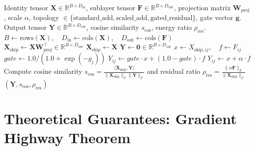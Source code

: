 \documentclass[11pt]{article}
\begin{document}
\begin{algorithm}[H]
\caption{Deterministic Residual Combination and Projection Execution}
\label{alg:residual}
\begin{algorithmic}[1]
\Require Identity tensor $\mathbf{X} \in \mathbb{R}^{B \times D_{\text{in}}}$, sublayer tensor $\mathbf{F} \in \mathbb{R}^{B \times D_{\text{out}}}$, projection matrix $\mathbf{W}_{\text{proj}}$, scale $\alpha$, topology $\in \{\text{standard\_add}, \text{scaled\_add}, \text{gated\_residual}\}$, gate vector $\mathbf{g}$.
\Ensure Output tensor $\mathbf{Y} \in \mathbb{R}^{B \times D_{\text{out}}}$, cosine similarity $s_{\text{cos}}$, energy ratio $\rho_{\text{res}}$.
\State $B \gets \text{rows}(\mathbf{X}), \quad D_{\text{in}} \gets \text{cols}(\mathbf{X}), \quad D_{\text{out}} \gets \text{cols}(\mathbf{F})$
    \State $\mathbf{X}_{\text{skip}} \gets \mathbf{X} \mathbf{W}_{\text{proj}}^\top \in \mathbb{R}^{B \times D_{\text{out}}}$
\Else
    \State $\mathbf{X}_{\text{skip}} \gets \mathbf{X}$
\EndIf
\State $\mathbf{Y} \gets \mathbf{0} \in \mathbb{R}^{B \times D_{\text{out}}}$
        \State $x \gets X_{\text{skip}, ij}, \quad f \gets F_{ij}$
            \State $gate \gets 1.0 / (1.0 + \exp(-g_j))$
            \State $Y_{ij} \gets gate \cdot x + (1.0 - gate) \cdot f$
        \Else
            \State $Y_{ij} \gets x + \alpha \cdot f$
        \EndIf
    \EndFor
\EndFor
\State Compute cosine similarity $s_{\text{cos}} = \frac{\langle \mathbf{X}_{\text{skip}}, \mathbf{Y} \rangle}{\|\mathbf{X}_{\text{skip}}\|_F \|\mathbf{Y}\|_F}$ and residual ratio $\rho_{\text{res}} = \frac{\|\alpha \mathbf{F}\|_F}{\|\mathbf{X}_{\text{skip}}\|_F}$
\State \Return $(\mathbf{Y}, s_{\text{cos}}, \rho_{\text{res}})$
\end{algorithmic}
\end{algorithm}

\section{Theoretical Guarantees: Gradient Highway Theorem}
\label{sec:correctness}
\end{document}

